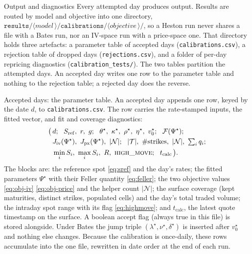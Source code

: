 \documentclass[a4paper, 11pt, reqno]{amsart}
\makeatletter
\def\section{\@startsection{section}{1}%
	\z@{.7\linespacing\@plus\linespacing}{.5\linespacing}%
	{\normalfont\bfseries\centering}}
\def\paragraph{\@startsection{paragraph}{4}%
	\z@\z@{-\fontdimen2\font}%
	{\normalfont\bfseries}}
\makeatother
\begin{document}
	\section{Output and diagnostics}\label{sec:output}
		Every attempted day produces output. Results are routed by model and objective into one directory,
		$\texttt{results/}\langle\textit{model}\,\rangle\texttt{/calibrations/}\langle\textit{objective}\,\rangle\texttt{/}$,
		so a Heston run never shares a file with a Bates run, nor an IV-space run with a price-space one.
		That directory holds three artefacts: a parameter table of accepted days
		(\texttt{calibrations.csv}), a rejection table of dropped days (\texttt{rejections.csv}), and a
		folder of per-day repricing diagnostics (\texttt{calibration\_tests/}). The two tables partition the
		attempted days. An accepted day writes one row to the parameter table and nothing to the rejection
		table; a rejected day does the reverse. 
		
		\paragraph{Accepted days: the parameter table.} An accepted day appends one row, keyed by the date
		$d$, to \texttt{calibrations.csv}. The row carries the rate-stamped inputs, the fitted vector, and
		fit and coverage diagnostics:
		\begin{equation}\label{eq:accepted-row}
		\begin{aligned}
			\bigl(\,
			&d;\ \ S_{\mathrm{ref}},\ r,\ g;\ \
			\theta^\star,\ \kappa^\star,\ \rho^\star,\ \eta^\star,\ v_0^\star;\ \
			\mathcal{F}(\Psi^\star); \\
			&J_{\mathrm{iv}}(\Psi^\star),\ J_{\mathrm{px}}(\Psi^\star),\ |\mathcal{N}|;\ \
			|\mathcal{T}|,\ \#\text{strikes},\ |\mathcal{N}|,\ \textstyle\sum_{i} q_i; \\
			&\min_i S_i,\ \max_i S_i,\ R,\ \textsc{high\_move};\ \ t_{\mathrm{calc}}
			\,\bigr).
		\end{aligned}
		\end{equation}
		The blocks are: the reference spot \eqref{eq:sref} and the day's rates; the fitted parameters
		$\Psi^\star$ with their Feller quantity \eqref{eq:feller}; the two objective values \eqref{eq:obj-iv}
		\eqref{eq:obj-price} and the helper count $|\mathcal{N}|$; the surface coverage (kept maturities,
		distinct strikes, populated cells) and the day's total traded volume; the intraday spot range with
		its flag \eqref{eq:highmove}; and $t_{\mathrm{calc}}$, the latest quote timestamp on the surface. A
		boolean accept flag (always true in this file) is stored alongside. Under Bates the jump triple
		$(\lambda^\star,\nu^\star,\delta^\star)$ is inserted after $v_0^\star$ and nothing else changes.
		Because the calibration is once-daily, these rows accumulate into the one file, rewritten in date
		order at the end of each run.
		
\end{document}
